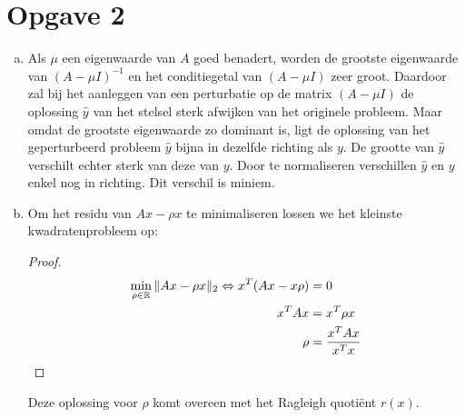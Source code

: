 \documentclass[a4paper]{article}
\newcommand{\opgave}[1]{\section*{Opgave #1}}
\begin{document}
\opgave{2}
\begin{enumerate}[a)] %
\item Als $\mu$ een eigenwaarde van $A$ goed benadert, worden de grootste eigenwaarde van $(A-\mu I)^{-1}$ en het conditiegetal van $(A-\mu I)$ zeer groot. Daardoor zal bij het aanleggen van een perturbatie op de matrix $(A-\mu I)$ de oplossing $\hat{y}$ van het stelsel sterk afwijken van het originele probleem. Maar omdat de grootste eigenwaarde zo dominant is, ligt de oplossing van het geperturbeerd probleem $\hat{y}$ bijna in dezelfde richting als $y$. De grootte van $\hat{y}$ verschilt echter sterk van deze van $y$. Door te normaliseren verschillen $\hat{y}$ en $y$ enkel nog in richting. Dit verschil is miniem.
\item Om het residu van $Ax-\rho x$ te minimaliseren lossen we het kleinste kwadratenprobleem op:
\begin{proof}
\begin{align}
\displaystyle\min_{\rho\in\mathbb{R}}\Arrowvert Ax-\rho x \Arrowvert _2 \Leftrightarrow x^{T}(Ax-x\rho) &= 0\label{eq1}\\
 x^TAx &= x^T\rho x \label{eq2}\\
 \rho&=\frac{x^TAx}{x^Tx} \label{eq:const1}
\end{align}
\end{proof}
Deze oplossing voor $\rho$ komt overeen met het Ragleigh quoti\"{e}nt $r(x)$.
\end{enumerate}
\end{document}
